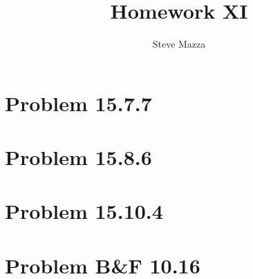 \documentclass[letterpaper,10pt]{article}
\title{Homework XI}
\author{Steve Mazza}
\begin{document}
\maketitle

\section*{Problem 15.7.7}

\section*{Problem 15.8.6}

\section*{Problem 15.10.4}

\section*{Problem B\&F 10.16}
\end{document}
